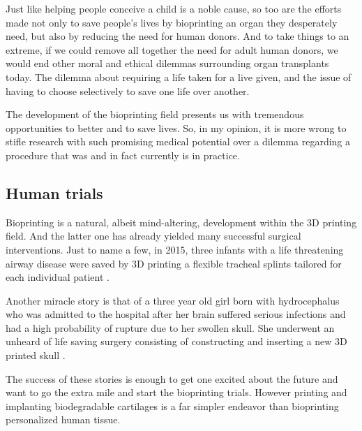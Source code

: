 \documentclass[12pt]{article} %
\begin{document}
Just like helping people conceive a child is a noble cause, so too are the efforts made not only to save people's lives by bioprinting an organ they desperately need, but also by reducing the need for human donors. And to take things to an extreme, if we could remove all together the need for adult human donors, we would end other moral and ethical dilemmas surrounding organ transplants today. The dilemma about requiring a life taken for a live given, and the issue of having to choose selectively to save one life over another. 

The development of the bioprinting field presents us with tremendous opportunities to better and to save lives. So, in my opinion, it is more wrong to stifle research with such promising medical potential over a dilemma regarding a procedure that was and in fact currently is in practice.



\subsection{Human trials} %

Bioprinting is a natural, albeit mind-altering, development within the 3D printing field. And the latter one has already yielded many successful surgical interventions. Just to name a few, in 2015, three infants with a life threatening airway disease were saved by 3D printing a flexible tracheal\footnotemark{} splints tailored for each individual patient \cite{Morrison:2015}.

Another miracle story is that of a three year old girl born with hydrocephalus\footnotemark{} who was admitted to the hospital after her brain suffered serious infections and had a high probability of rupture due to her swollen skull. She underwent an unheard of life saving surgery consisting of constructing and inserting a new 3D printed skull \cite{3dprint.com:2015}. 

The success of these stories is enough to get one excited about the future and want to go the extra mile and start the bioprinting trials. However printing and implanting biodegradable cartilages is a far simpler endeavor than bioprinting personalized human tissue. 
\end{document}

